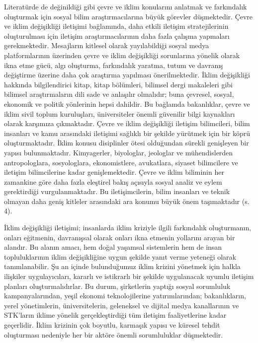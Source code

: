 \documentclass[
]{book}
\begin{document}
Literatürde de değinildiği gibi çevre ve iklim konularını anlatmak ve farkındalık oluşturmak için sosyal bilim araştırmacılarına büyük görevler düşmektedir. Çevre ve iklim değişikliği iletişimi bağlamında, daha etkili iletişim stratejilerinin oluşturulması için iletişim araştırmacılarının daha fazla çalışma yapmaları gerekmektedir. Mesajların kitlesel olarak yayılabildiği sosyal medya platformlarının üzerinden çevre ve iklim değişikliği sorunlarına yönelik olarak ikna etme gücü, algı oluşturma, farkındalık yaratma, tutum ve davranış değiştirme üzerine daha çok araştırma yapılması önerilmektedir. İklim değişikliği hakkında bilgilendirici kitap, kitap bölümleri, bilimsel dergi makaleleri gibi bilimsel araştırmaların dili sade ve anlaşılır olmalıdır; buna çevresel, sosyal, ekonomik ve politik yönlerinin hepsi dahildir. Bu bağlamda bakanlıklar, çevre ve iklim sivil toplum kuruluşları, üniversiteler önemli güvenilir bilgi kaynakları olarak karşımıza çıkmaktadır.
Çevre ve iklim değişikliği iletişim bilimcileri, bilim insanları ve kamu arasındaki iletişimi sağlıklı bir şekilde yürütmek için bir köprü oluşturmaktadır. İklim konusu disiplinler ötesi olduğundan sürekli genişleyen bir yapısı bulunmaktadır. Kimyagerler, biyologlar, jeologlar ve mühendislerden antropologlara, sosyologlara, ekonomistlere, avukatlara, siyaset bilimcilere ve iletişim bilimcilerine kadar genişlemektedir. \citep{flor2004environmental} Çevre ve iklim biliminin her zamankine göre daha fazla eleştirel bakış açısıyla sosyal analiz ve eylem gerektirdiği vurgulanmaktadır. Bu iletişimcilerin, bilim insanları ve teknik olmayan daha geniş kitleler arasındaki ara konumu büyük önem taşımaktadır (s. 4). \citep{jurin2010environmental}

İklim değişikliği iletişimi; insanlarda iklim kriziyle ilgili farkındalık oluşturmanın, onları eğitmenin, davranışsal olarak onları ikna etmenin yollarını arayan bir alandır. Bu alanın amacı, hem doğal yaşamsal sistemlerin hem de insan topluluklarının iklim değişikliğine uygun şekilde yanıt verme yeteneği olarak tanımlanabilir. Şu an içinde bulunduğumuz iklim krizini yönetmek için halkla ilişkiler uygulayıcıları, kararlı ve istikrarlı bir şekilde uygulanacak uyumlu iletişim planları oluşturmalıdırlar. Bu durum, şirketlerin yaptığı sosyal sorumluluk kampanyalarından, yeşil ekonomi teknolojilerine yatırımlarından; bakanlıkların, yerel yönetimlerin, üniversitelerin, geleneksel ve dijital medya kanallarının ve STK'ların iklime yönelik gerçekleştirdiği tüm iletişim faaliyetlerine kadar geçerlidir. İklim krizinin çok boyutlu, karmaşık yapısı ve küresel tehdit oluşturması nedeniyle her bir aktöre önemli sorumluluklar düşmektedir.
\end{document}
